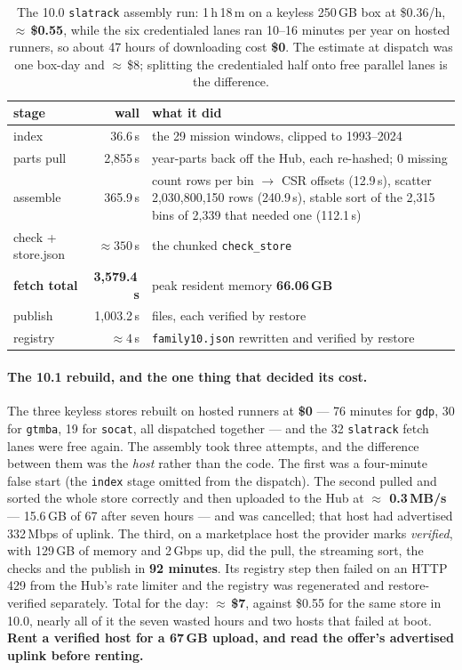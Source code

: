 \documentclass[10pt]{article}
\newcommand{\code}[1]{\texttt{#1}}
\begin{document}
\begin{table}[h]
\centering\footnotesize
\begin{tabular}{@{}lr>{\raggedright\arraybackslash}p{9.6cm}@{}}
\toprule
stage & wall & what it did \\
\midrule
index             & 36.6\,s   & the 29 mission windows, clipped to 1993--2024 \\
parts pull        & 2,855\,s  & 32 year-parts back off the Hub, each re-hashed; 0 missing \\
assemble          & 365.9\,s  & count rows per bin $\to$ CSR offsets (12.9\,s), scatter 2,030,800,150 rows (240.9\,s), stable sort of the 2,315 bins of 2,339 that needed one (112.1\,s) \\
check + store.json & $\approx 350$\,s & the chunked \code{check\_store} \\
\textbf{fetch total} & \textbf{3,579.4\,s} & peak resident memory \textbf{66.06\,GB} \\
publish           & 1,003.2\,s & 10 files, each verified by restore \\
registry          & $\approx 4$\,s & \code{family10.json} rewritten and verified by restore \\
\bottomrule
\end{tabular}
\caption{The 10.0 \code{slatrack} assembly run: 1\,h\,18\,m on a keyless 250\,GB box at \$0.36/h, \textbf{$\approx$\,\$0.55}, while the six credentialed lanes ran 10--16 minutes per year on hosted runners, so about 47 hours of downloading cost \textbf{\$0}. The estimate at dispatch was one box-day and $\approx$\,\$8; splitting the credentialed half onto free parallel lanes is the difference.}
\end{table}

\paragraph{The 10.1 rebuild, and the one thing that decided its cost.} The
three keyless stores rebuilt on hosted runners at \textbf{\$0} --- 76 minutes
for \code{gdp}, 30 for \code{gtmba}, 19 for \code{socat}, all dispatched
together --- and the 32 \code{slatrack} fetch lanes were free again. The
assembly took three attempts, and the difference between them was the
\emph{host} rather than the code. The first was a four-minute false start (the
\code{index} stage omitted from the dispatch). The second pulled and sorted the
whole store correctly and then uploaded to the Hub at \textbf{$\approx$
0.3\,MB/s} --- 15.6\,GB of 67 after seven hours --- and was cancelled; that
host had advertised 332\,Mbps of uplink. The third, on a marketplace host the
provider marks \emph{verified}, with 129\,GB of memory and 2\,Gbps up, did the
pull, the streaming sort, the checks and the publish in \textbf{92 minutes}.
Its registry step then failed on an HTTP 429 from the Hub's rate limiter and the
registry was regenerated and restore-verified separately. Total for the day:
\textbf{$\approx$\,\$7}, against \$0.55 for the same store in 10.0, nearly all
of it the seven wasted hours and two hosts that failed at boot. \textbf{Rent a
verified host for a 67\,GB upload, and read the offer's advertised uplink
before renting.}
\end{document}
